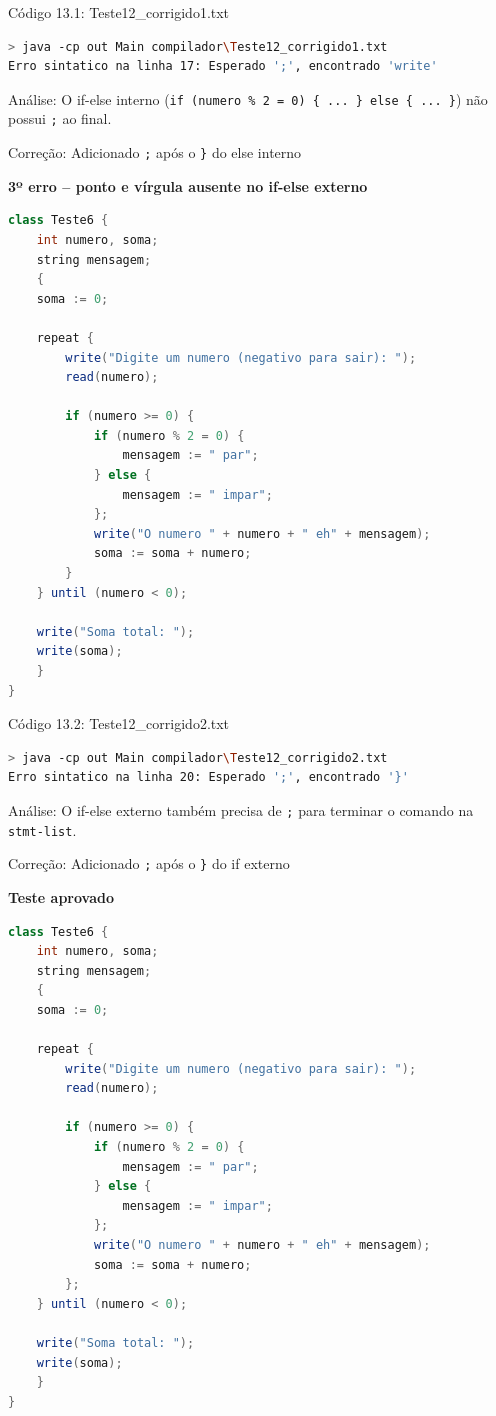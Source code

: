 \documentclass[12pt,a4paper]{article}
\begin{document}
Código 13.1: Teste12\_corrigido1.txt

\begin{lstlisting}[language=bash]
> java -cp out Main compilador\Teste12_corrigido1.txt
Erro sintatico na linha 17: Esperado ';', encontrado 'write'
\end{lstlisting}

Análise: O if-else interno (\texttt{if (numero \% 2 = 0) \{ ... \} else \{ ... \}}) não possui \texttt{;} ao final.

Correção: Adicionado \texttt{;} após o \texttt{\}} do else interno

\textbf{3º erro -- ponto e vírgula ausente no if-else externo}

\begin{lstlisting}[language=Java]
class Teste6 {
    int numero, soma;
    string mensagem;
    {
    soma := 0;

    repeat {
        write("Digite um numero (negativo para sair): ");
        read(numero);

        if (numero >= 0) {
            if (numero % 2 = 0) {
                mensagem := " par";
            } else {
                mensagem := " impar";
            };
            write("O numero " + numero + " eh" + mensagem);
            soma := soma + numero;
        }
    } until (numero < 0);

    write("Soma total: ");
    write(soma);
    }
}
\end{lstlisting}

Código 13.2: Teste12\_corrigido2.txt

\begin{lstlisting}[language=bash]
> java -cp out Main compilador\Teste12_corrigido2.txt
Erro sintatico na linha 20: Esperado ';', encontrado '}'
\end{lstlisting}

Análise: O if-else externo também precisa de \texttt{;} para terminar o comando na \texttt{stmt-list}.

Correção: Adicionado \texttt{;} após o \texttt{\}} do if externo

\textbf{Teste aprovado}

\begin{lstlisting}[language=Java]
class Teste6 {
    int numero, soma;
    string mensagem;
    {
    soma := 0;

    repeat {
        write("Digite um numero (negativo para sair): ");
        read(numero);

        if (numero >= 0) {
            if (numero % 2 = 0) {
                mensagem := " par";
            } else {
                mensagem := " impar";
            };
            write("O numero " + numero + " eh" + mensagem);
            soma := soma + numero;
        };
    } until (numero < 0);

    write("Soma total: ");
    write(soma);
    }
}
\end{lstlisting}
\end{document}
